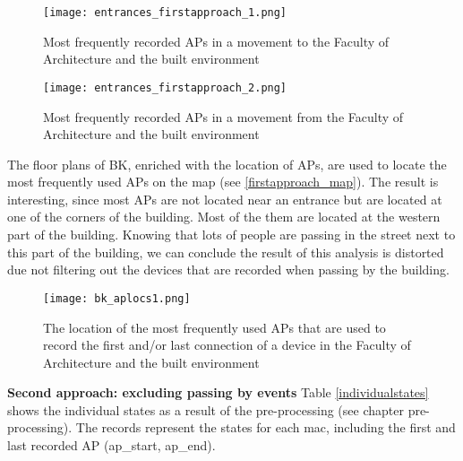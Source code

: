 \begin{figure}[H]
	\centering
	\texttt{[image: entrances\_firstapproach\_1.png]}
	\captionsetup{justification=centering}
	\caption{Most frequently recorded APs in a movement to the Faculty of Architecture and the built environment}
	\label{firstapproach_graph_1}
\end{figure}
\begin{figure}[H]
	\centering
	\texttt{[image: entrances\_firstapproach\_2.png]}
	\captionsetup{justification=centering}
	\caption{Most frequently recorded APs in a movement from the Faculty of Architecture and the built environment}
	\label{firstapproach_graph_2}
\end{figure}
The floor plans of BK, enriched with the location of APs, are used to locate the most frequently used APs on the map (see \autoref{firstapproach_map}). The result is interesting, since most APs are not located near an entrance but are located at one of the corners of the building. Most of the them are located at the western part of the building. Knowing that lots of people are passing in the street next to this part of the building, we can conclude the result of this analysis is distorted due not filtering out the devices that are recorded when passing by the building.
\begin{figure}[H]
	\centering
	\texttt{[image: bk\_aplocs1.png]}
	\captionsetup{justification=centering}
	\caption{The location of the most frequently used APs that are used to record the first and/or last connection of a device in the Faculty of Architecture and the built environment}
	\label{firstapproach_map}
\end{figure}
\textbf{Second approach: excluding passing by events}
Table \autoref{individualstates} shows the individual states as a result of the pre-processing (see chapter pre-processing). The records represent the states for each mac, including the first and last recorded AP (ap\_start, ap\_end). \\\\
